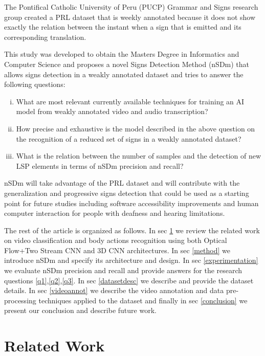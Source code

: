 \documentclass[twocolumn]{article}
\begin{document}
The Pontifical Catholic University of Peru (PUCP) Grammar and  Signs research group created a PRL dataset \cite{lsp_dataset} that is weekly annotated because it does not show exactly the relation between the instant when a sign that is emitted and its corresponding translation.

This study was developed to obtain the Masters Degree in Informatics and Computer Science and proposes a novel Signs Detection Method (nSDm) that allows signs detection in a weakly annotated dataset and tries to answer the following questions:

\begin{enumerate}[(i)]
\item What are most relevant currently available techniques for training an AI model from  weakly annotated video and audio transcription?\label{q1}
\item How precise and exhaustive is the model described in the above question on the recognition of a reduced set of signs in a weakly annotated dataset?\label{q2}
\item What is the relation between the number of samples and the detection of new LSP elements in terms of nSDm precision and recall?\label{q3}
\end{enumerate}

nSDm will take advantage of the PRL dataset \cite{lsp_dataset} and will contribute with the generalization and progressive signs detection that could be used as a starting point for future studies including software accessibility improvements and human computer interaction for people with deafness and hearing limitations.

The rest of the article is organized as follows. In sec \ref{relatedwork} we review the related work on video classification and body actions recognition using both Optical Flow+Two Stream CNN and 3D CNN architectures. In sec \ref{method} we introduce nSDm and specify its architecture and design. In sec \ref{experimentation} we evaluate nSDm precision and recall and provide answers for the research questions \ref{q1},\ref{q2},\ref{q3}. In sec \ref{datasetdesc} we describe and provide the dataset details. In sec \ref{videoannot} we describe the video annotation and data pre-processing techniques applied to the dataset and finally in sec \ref{conclusion} we present our conclusion and describe future work.
\section{Related Work} \label{relatedwork}
\end{document}
